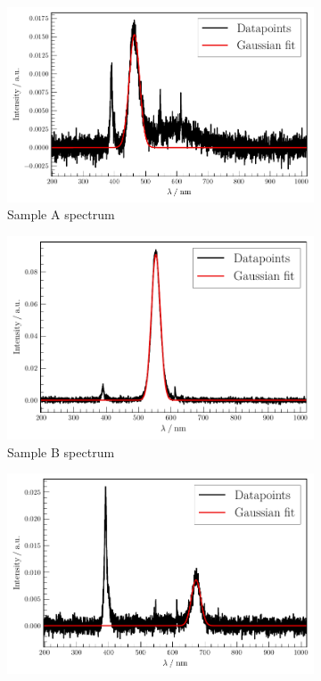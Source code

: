 %
\begin{figure}
    \centering
\begin{subfigure}{.32\textwidth}
    \centering
    \includegraphics[width=\textwidth]{plots/Samp_A_D.pdf}
    \caption{Sample A spectrum}
    \label{fig:Samp_A_D}
\end{subfigure}
\begin{subfigure}{.32\textwidth}
    \centering
    \includegraphics[width=\textwidth]{plots/Samp_B_D.pdf}
    \caption{Sample B spectrum}
    \label{fig:Samp_B_D}
\end{subfigure}
\begin{subfigure}{.32\textwidth}
    \centering
    \includegraphics[width=\textwidth]{plots/Samp_C_D.pdf}

\end{subfigure}
\end{figure}
